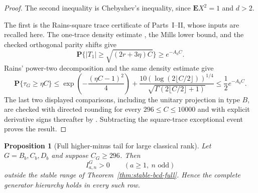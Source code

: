 \documentclass[11pt,reqno]{amsart}
\theoremstyle{plain}
\newtheorem{proposition}[theorem]{Proposition}
\theoremstyle{definition}
\begin{document}
\begin{proof}
The second inequality is Chebyshev's inequality, since
$\mathbf EX^2=1$ and $d>2$.

The first is the Rains-square trace certificate of Parts~I--II, whose
inputs are recalled here.  The one-trace density estimate
\cite[Theorem~1.4]{CJL2022}, the Mills lower bound, and the checked
orthogonal parity shifts give
\[
 \mathbf P\{|T_1|\geq\sqrt{(2r+3\eta)C}\}
 \geq e^{-A_0C}.
\]
Rains' power-two decomposition and the same density estimate give
\[
 \mathbf P\{\tau_G\geq\eta C\}
 \leq
 \exp\!\left(-\frac{(\eta C-1)^2}{4}\right)
 +\frac{10(\log(2\lfloor C/2\rfloor))^{1/4}}
 {\sqrt{\Gamma(2\lfloor C/2\rfloor+1)}}
 \leq\frac12e^{-A_0C}.
\]
The last two displayed comparisons, including the unitary projection in
type $B$, are checked with directed rounding for every
$296\leq C\leq10000$ and with explicit derivative signs thereafter by
.  Subtracting the
square-trace exceptional event proves the result.
\end{proof}

\begin{proposition}[Full higher-minus tail for large classical rank]
\label{prop:bcd-high-rank-full-tail}
Let $G=B_b,C_b,D_b$ and suppose $C_G\geq296$.  Then
\[
 I^G_{a,n}>0
 \qquad(a\geq1,\ n\text{ odd})
\]
outside the stable range of Theorem~\ref{thm:stable-bcd-full}.  Hence the
complete generator hierarchy holds in every such row.
\end{proposition}
\end{document}
